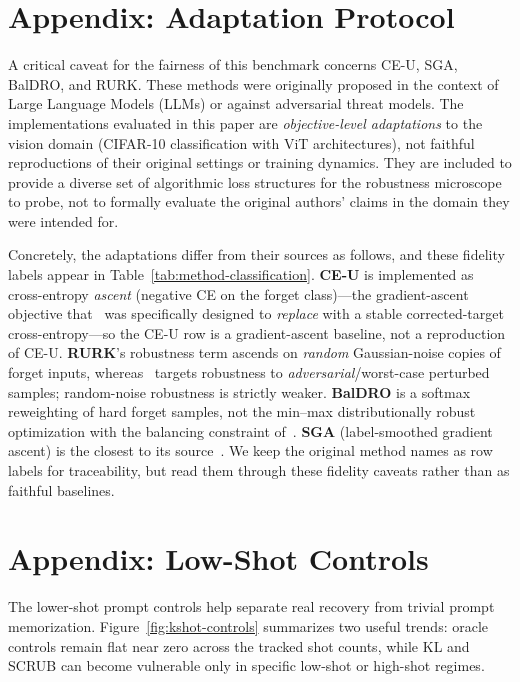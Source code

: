 \documentclass{article}
\begin{document}
\section{Appendix: Adaptation Protocol}
\label{sec:adaptation}
A critical caveat for the fairness of this benchmark concerns CE-U, SGA, BalDRO, and RURK. These methods were originally proposed in the context of Large Language Models (LLMs) or against adversarial threat models. The implementations evaluated in this paper are \emph{objective-level adaptations} to the vision domain (CIFAR-10 classification with ViT architectures), not faithful reproductions of their original settings or training dynamics. They are included to provide a diverse set of algorithmic loss structures for the robustness microscope to probe, not to formally evaluate the original authors' claims in the domain they were intended for.

Concretely, the adaptations differ from their sources as follows, and these fidelity labels appear in Table~\ref{tab:method-classification}. \textbf{CE-U} is implemented as cross-entropy \emph{ascent} (negative CE on the forget class)---the gradient-ascent objective that~\cite{yang2025ceu} was specifically designed to \emph{replace} with a stable corrected-target cross-entropy---so the CE-U row is a gradient-ascent baseline, not a reproduction of CE-U. \textbf{RURK}'s robustness term ascends on \emph{random} Gaussian-noise copies of forget inputs, whereas~\cite{hsu2025rurk} targets robustness to \emph{adversarial}/worst-case perturbed samples; random-noise robustness is strictly weaker. \textbf{BalDRO} is a softmax reweighting of hard forget samples, not the min--max distributionally robust optimization with the balancing constraint of~\cite{shao2026baldro}. \textbf{SGA} (label-smoothed gradient ascent) is the closest to its source~\cite{pang2025sga}. We keep the original method names as row labels for traceability, but read them through these fidelity caveats rather than as faithful baselines.

\section{Appendix: Low-Shot Controls}
The lower-shot prompt controls help separate real recovery from trivial prompt memorization. Figure~\ref{fig:kshot-controls} summarizes two useful trends: oracle controls remain flat near zero across the tracked shot counts, while KL and SCRUB can become vulnerable only in specific low-shot or high-shot regimes.
\end{document}
